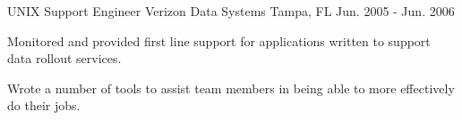 \begin{cventries}
\cventry
{UNIX Support Engineer}
{Verizon Data Systems}
{Tampa, FL}
{Jun. 2005 - Jun. 2006}
{
\begin{cvitems}
\item {Monitored and provided first line support for applications written to support data rollout services.}
\item {Wrote a number of tools to assist team members in being able to more effectively do their jobs.}
\end{cvitems}
}

\end{cventries}

